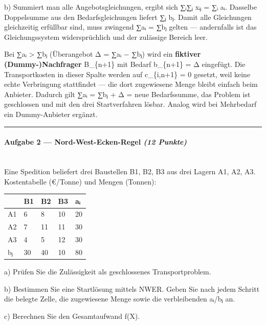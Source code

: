 \documentclass[11pt, a4paper]{article}
\begin{document}
b) Summiert man alle Angebotsgleichungen, ergibt sich ∑ᵢ∑ⱼ xᵢⱼ = ∑ᵢ aᵢ. Dasselbe Doppelsumme aus den Bedarfsgleichungen liefert ∑ⱼ bⱼ. Damit alle Gleichungen gleichzeitig erfüllbar sind, muss zwingend ∑aᵢ = ∑bⱼ gelten — andernfalls ist das Gleichungssystem widersprüchlich und der zulässige Bereich leer.


Bei ∑aᵢ > ∑bⱼ (Überangebot Δ = ∑aᵢ − ∑bⱼ) wird ein \textbf{fiktiver (Dummy-)Nachfrager} B\_\{n+1\} mit Bedarf b\_\{n+1\} = Δ eingefügt. Die Transportkosten in dieser Spalte werden auf c\_\{i,n+1\} = 0 gesetzt, weil keine echte Verbringung stattfindet — die dort zugewiesene Menge bleibt einfach beim Anbieter. Dadurch gilt ∑aᵢ = ∑bⱼ + Δ = neue Bedarfssumme, das Problem ist geschlossen und mit den drei Startverfahren lösbar. Analog wird bei Mehrbedarf ein Dummy-Anbieter ergänzt.



\noindent\textcolor{rulegray}{\rule{\linewidth}{0.4pt}}


\paragraph{Aufgabe 2 — Nord-West-Ecken-Regel \textit{(12 Punkte)}}\mbox{}\\[2pt]

Eine Spedition beliefert drei Baustellen B1, B2, B3 aus drei Lagern A1, A2, A3. Kostentabelle (€/Tonne) und Mengen (Tonnen):



{\small
\begin{tabularx}{\linewidth}{XXXXX}
\hline
\rowcolor{tableheadbg}
{\color{white}\textbf{}} & {\color{white}\textbf{B1}} & {\color{white}\textbf{B2}} & {\color{white}\textbf{B3}} & {\color{white}\textbf{aᵢ}} \\[2pt]
\hline
\endhead
\hline
\endfoot
A1 & 6 & 8 & 10 & 20 \\
A2 & 7 & 11 & 11 & 30 \\
A3 & 4 & 5 & 12 & 30 \\
bⱼ & 30 & 40 & 10 & 80 \\
\end{tabularx}
}


a) Prüfen Sie die Zulässigkeit als geschlossenes Transportproblem.

b) Bestimmen Sie eine Startlösung mittels NWER. Geben Sie nach jedem Schritt die belegte Zelle, die zugewiesene Menge sowie die verbleibenden aᵢ/bⱼ an.

c) Berechnen Sie den Gesamtaufwand f(X).
\end{document}
